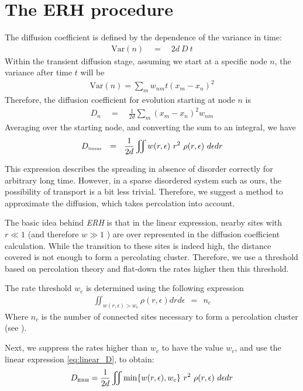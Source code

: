 \section{The ERH procedure}

The diffusion coefficient is defined by the dependence
of the variance in time:
%
\begin{align}
\textrm{Var}(n) \quad =\quad 2d\ D\ t
\end{align}
%
Within the transient diffusion stage,
assuming we start at a specific node $n$, the variance after time
$t$ will be
%
\begin{align}
\textrm{Var}(n) = \sum_m w_{nm} t (x_m-x_n)^2
\end{align}
Therefore, the diffusion coefficient for evolution 
starting at node $n$ is
%
\begin{align}
D_n \quad=\quad \frac{1}{2d}\sum_m (x_m-x_n)^2 w_{nm}
\end{align}
%
Averaging over the starting node, and converting the sum to an integral,
we have
%
\begin{align}\label{eq:linear_D}
D_{\tbox{linear}}  \ \ = \ \ \frac{1}{2d}\iint w(r,\epsilon) \ r^2  \ \rho(r,\epsilon) \ d\epsilon dr 
\end{align}
%

This expression describes the spreading in absence of disorder correctly
for arbitrary long time. However, in a sparse disordered system such as ours,
the possibility of transport is a bit less trivial. Therefore, we suggest
a method to approximate the diffusion, which takes percolation into account.


The basic idea behind \emph{ERH} is that in the linear
expression, nearby sites 
with $r\ll 1$ (and therefore $w \gg 1$ ) are over represented in
the diffusion coefficient calculation. While the transition to
these sites is indeed high, the distance covered is not enough
to form a percolating cluster. Therefore, we use a threshold based
on percolation theory and flat-down the rates higher then this threshold.

The rate threshold $w_c$ is determined using the following expression
%
\begin{align}\label{eq:threshold}
\iint_{w(r,\epsilon)>w_c} \rho(r,\epsilon)drd\epsilon \ \ = \ \ n_c
\end{align}
%
Where $n_c$ is the number of connected sites necessary to form a percolation
cluster (see ).


Next, we suppress the rates higher than $w_c$ to have the value $w_c$,
and use the linear expression \ref{eq:linear_D}, to obtain:
%
\begin{align}\label{eq:ERH_D}
D_{\tbox{ERH}} = \frac{1}{2d}\iint \min\{w(r,\epsilon),w_c\} \ r^2  \ \rho(r,\epsilon) \ d\epsilon dr
\end{align}
%



